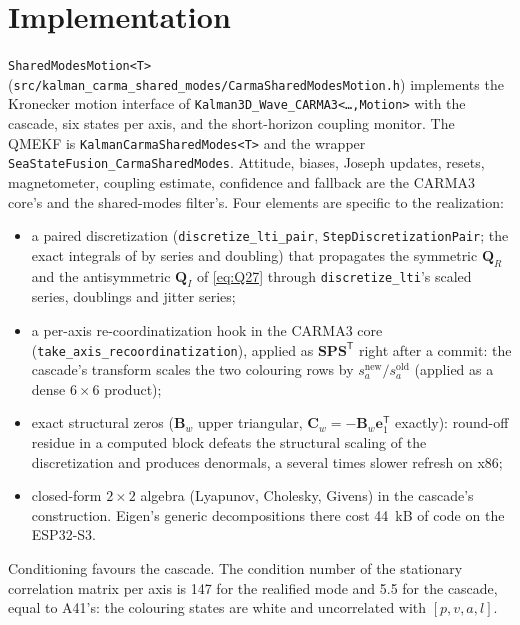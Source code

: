 \documentclass[conference]{IEEEtran}
\DeclareRobustCommand{\vct}[1]{\bm{#1}}
\DeclareRobustCommand{\mat}[1]{\bm{#1}}
\newcommand{\T}{^{\mathsf T}}
\theoremstyle{bodysmall}
\begin{document}
\section{Implementation}
\texttt{SharedModesMotion<T>}
(\texttt{src/kalman\_carma\_shared\_modes/CarmaSharedModesMotion.h})
implements the Kronecker motion interface of
\texttt{Kalman3D\_Wave\_CARMA3<\dots,Motion>} with the cascade, six states
per axis, and the short-horizon coupling monitor. The QMEKF is
\texttt{KalmanCarmaSharedModes<T>} and the wrapper
\texttt{SeaStateFusion\_CarmaSharedModes}. Attitude, biases, Joseph
updates, resets, magnetometer, coupling estimate, confidence and fallback are
the CARMA3 core's and the shared-modes filter's. Four elements are specific
to the realization:
\begin{itemize}
\item a paired discretization (\texttt{discretize\_lti\_pair},
  \texttt{StepDiscretizationPair}; the exact integrals of \cite{vanloan78}
  by series and doubling) that propagates the symmetric
  $\mat Q_R$ and the antisymmetric $\mat Q_I$ of \eqref{eq:Q27} through
  \texttt{discretize\_lti}'s scaled series, doublings and jitter series;
\item a per-axis re-coordinatization hook in the CARMA3 core
  (\texttt{take\_axis\_recoordinatization}), applied as
  $\mat S\mat P\mat S\T$ right after a commit: the cascade's transform
  scales the two colouring rows by $s_a^{\text{new}}/s_a^{\text{old}}$ (applied
  as a dense $6\times6$ product);
\item exact structural zeros ($\mat B_w$ upper triangular,
  $\mat C_w=-\mat B_w\vct e_1\T$ exactly): round-off residue in a computed
  block defeats the structural scaling of the discretization and produces
  denormals, a several times slower refresh on x86;
\item closed-form $2\times2$ algebra (Lyapunov, Cholesky, Givens) in the
  cascade's construction. Eigen's generic decompositions there cost
  \SI{44}{kB} of code on the ESP32-S3.
\end{itemize}
Conditioning favours the cascade. The condition number of the stationary
correlation matrix per axis is 147 for the realified mode and 5.5 for the
cascade, equal to A41's: the colouring states are white and uncorrelated
with $[p,v,a,l]$.
\end{document}

